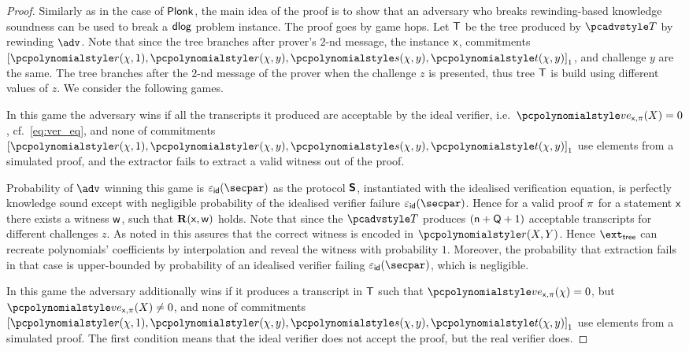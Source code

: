 \begin{proof}
	Similarly as in the case of $\textnormal{\textsf{Plonk}}$, the main idea of the proof is to show that an
  adversary who breaks rewinding-based knowledge soundness can be used to break a $\mathsf{dlog}$
  problem instance. The proof goes by game hops. Let $\mathsf{T}$ be the tree produced by
  $\tdv$ by rewinding $\adv$. Note that since the tree branches after prover's $2$-nd
  message, the instance $\mathsf{x}$, commitments
  $\gone{\p{r} (\chi, 1), \p{r} (\chi, y), \p{s} (\chi, y), \p{t} (\chi, y)}$, and
  challenge $y$ are the same. The tree branches after the $2$-nd message of the
  prover when the challenge $z$ is presented, thus tree $\mathsf{T}$ is build using
  different values of $z$.
	We consider the following games.
	
	 In this game the adversary wins if all the transcripts it
	produced are acceptable by the ideal verifier,
	i.e.~$\vereq_{\inp, \zkproof}(X) = 0$, cf.~\cref{eq:ver_eq}, and none of
	commitments
	$\gone{\p{r} (\chi, 1), \p{r} (\chi, y), \p{s} (\chi, y), \p{t} (\chi, y)}$ use
	elements from a simulated proof, and the extractor fails to extract a valid
	witness out of the proof.
	
	 Probability of
	$\adv$ winning this game is $\epsid(\secpar)$ as the protocol $\bm{\mathsf{S}}$,
	instantiated with the idealised verification equation, is perfectly
	knowledge sound except with negligible probability of the idealised verifier
	failure $\epsid(\secpar)$. Hence for a valid proof $\pi$ for a
	statement $\mathsf{x}$ there exists a witness $\mathsf{w}$, such that $\mathbf{R}(\mathsf{x}, \mathsf{w})$
	holds. Note that since the $\tdv$ produces $(\mathsf{n} + \mathsf{Q} + 1)$
	acceptable transcripts for different challenges $z$. As noted in
	\cite{CCS:MBKM19} this assures that the correct witness is encoded in
	$\p{r} (X, Y)$. Hence $\extt$ can recreate polynomials' coefficients by
	interpolation and reveal the witness with probability $1$. Moreover, the
	probability that extraction fails in that case is upper-bounded by
	probability of an idealised verifier failing $\epsid(\secpar)$, which is
	negligible.
	
	 In this game the adversary additionally wins if it produces a
	transcript in $\mathsf{T}$ such that $\vereq_{\inp, \zkproof}(\chi) = 0$, but
	$\vereq_{\inp, \zkproof}(X) \neq 0$, and none of commitments
	$\gone{\p{r} (\chi, 1), \p{r} (\chi, y), \p{s} (\chi, y), \p{t} (\chi, y)}$
	use elements from a simulated proof.  The first condition means that the
	ideal verifier does not accept the proof, but the real verifier does.
	

\end{proof}
